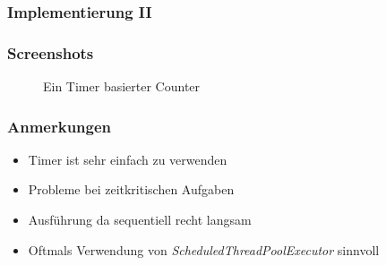 \begin{frame}
   \frametitle{Implementierung II}
	
\end{frame}

\begin{frame}
   \frametitle{Screenshots}
	\begin{figure}[h!]
	  \centering
	  \hfill
	  \caption{
		  Ein Timer basierter Counter
	  }
	  \label{fig:timer}
	\end{figure}
\end{frame}

\begin{frame}
   \frametitle{Anmerkungen}
   \begin{itemize}
     	\item Timer ist sehr einfach zu verwenden
     	\item Probleme bei zeitkritischen Aufgaben
     	\item Ausführung da sequentiell recht langsam
     	\item Oftmals Verwendung von \emph{ScheduledThreadPoolExecutor} sinnvoll
   \end{itemize}
\end{frame}

